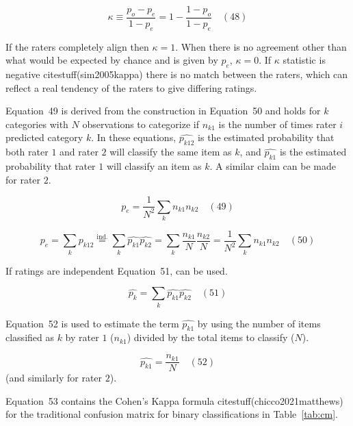 \documentclass[preprint,12pt]{elsarticle}
\begin{document}
\begin{equation}
	\kappa \equiv {\frac {p_{o}-p_{e}}{1-p_{e}}}=1-{\frac {1-p_{o}}{1-p_{e}}}
	\quad\left(48\right)
\end{equation}

If the raters completely align then $\kappa = 1$. When there is no agreement other than what would be expected by chance and is given by $p_{e}$, $\kappa = 0$. If $\kappa$ statistic is negative citestuff(sim2005kappa) there is no match between the raters, which can reflect a real tendency of the raters to give differing ratings.

Equation~49 is derived from the construction in Equation~50 and holds for $k$ categories with $N$ observations to categorize if $n_{k1}$ is the number of times rater $i$ predicted category $k$. In these equations, ${\widehat{p_{k12}}}$ is the estimated probability that both rater $1$ and rater $2$ will classify the same item as $k$, and ${\widehat {p_{k1}}}$ is the estimated probability that rater $1$ will classify an item as $k$. A similar claim can be made for rater $2$.

\begin{equation}
	p_{e}={\frac {1}{N^{2}}}\sum_{k}n_{k1}n_{k2}
	\quad\left(49\right)
\end{equation}

\begin{equation}
	p_{e}=\sum_{k}{\widehat {p_{k12}}}{\overset{\text{ind.}}{=}}\sum_{k}{\widehat {p_{k1}}}{\widehat {p_{k2}}}=\sum_{k}{\frac {n_{k1}}{N}}{\frac {n_{k2}}{N}}={\frac {1}{N^{2}}}\sum_{k}n_{k1}n_{k2}
	\quad\left(50\right)
\end{equation}

If ratings are independent Equation~51, can be used.

\begin{equation}
	\textstyle{\widehat{p_{k}}}=\sum_{k}{\widehat{p_{k1}}}{\widehat {p_{k2}}}
	\quad\left(51\right)
\end{equation}

Equation~52 is used to estimate the term $\widehat{p_{k1}}$ by using the number of items classified as $k$ by rater $1$ ($n_{k1}$) divided by the total items to classify ($N$).

\begin{equation}
	\widehat {p_{k1}}=\frac{n_{k1}}{N}
	\quad\left(52\right)
\end{equation}
 (and similarly for rater $2$).
 
Equation~53 contains the Cohen's Kappa formula citestuff(chicco2021matthews) for the traditional confusion matrix for binary classifications in Table~\ref{tab:cm}.
\end{document}
